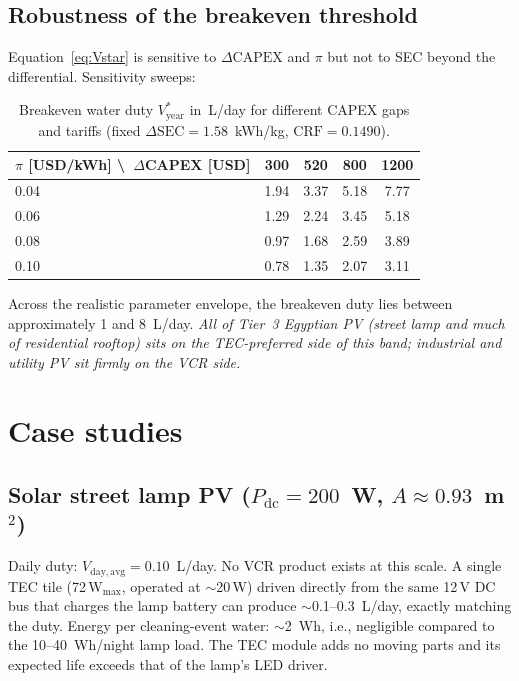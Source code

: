 \documentclass[11pt,a4paper]{article}
\begin{document}
\subsection{Robustness of the breakeven threshold}
Equation~\eqref{eq:Vstar} is sensitive to $\Delta\mathrm{CAPEX}$ and $\pi$ but not to SEC beyond the differential. Sensitivity sweeps:
\begin{table}[h]
\centering
\caption{Breakeven water duty $V_{\mathrm{year}}^{*}$ in~L/day for different CAPEX gaps and tariffs (fixed $\Delta\mathrm{SEC}=1.58$~kWh/kg, $\mathrm{CRF}=0.1490$).}
\begin{tabular}{@{}lcccc@{}}
\toprule
$\pi$ [USD/kWh] \textbackslash\ $\Delta$CAPEX [USD] & 300 & 520 & 800 & 1200 \\
\midrule
0.04 & 1.94 & 3.37 & 5.18 & 7.77 \\
0.06 & 1.29 & 2.24 & 3.45 & 5.18 \\
0.08 & 0.97 & 1.68 & 2.59 & 3.89 \\
0.10 & 0.78 & 1.35 & 2.07 & 3.11 \\
\bottomrule
\end{tabular}
\end{table}
Across the realistic parameter envelope, the breakeven duty lies between approximately 1 and 8~L/day. \emph{All of Tier~3 Egyptian PV (street lamp and much of residential rooftop) sits on the TEC-preferred side of this band; industrial and utility PV sit firmly on the VCR side.}

\section{Case studies}
\subsection{Solar street lamp PV ($P_{\mathrm{dc}}=200$~W, $A\approx 0.93$~m$^2$)}
Daily duty: $V_{\mathrm{day,avg}}=0.10$~L/day. No VCR product exists at this scale. A single TEC tile (72\,W$_{\mathrm{max}}$, operated at $\sim$20\,W) driven directly from the same 12\,V DC bus that charges the lamp battery can produce $\sim$0.1--0.3~L/day, exactly matching the duty. Energy per cleaning-event water: $\sim$2~Wh, i.e., negligible compared to the 10--40~Wh/night lamp load. The TEC module adds no moving parts and its expected life exceeds that of the lamp's LED driver.
\end{document}
